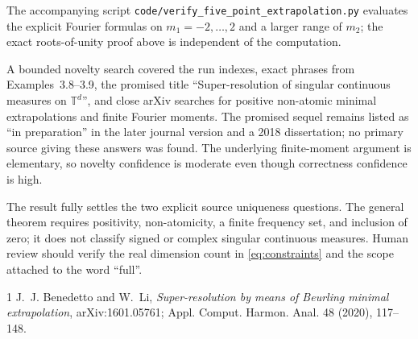 \documentclass[11pt,a4paper]{article}
\newcommand{\T}{\mathbb{T}}
\begin{document}
The accompanying script
\texttt{code/verify\_five\_point\_extrapolation.py} evaluates the explicit
Fourier formulas on $m_1=-2,\ldots,2$ and a larger range of $m_2$; the exact
roots-of-unity proof above is independent of the computation.

A bounded novelty search covered the run indexes, exact phrases from
Examples~3.8--3.9, the promised title ``Super-resolution of singular continuous
measures on $\T^d$'', and close arXiv searches for positive non-atomic minimal
extrapolations and finite Fourier moments.  The promised sequel remains listed
as ``in preparation'' in the later journal version and a 2018 dissertation;
no primary source giving these answers was found.  The underlying
finite-moment argument is elementary, so novelty confidence is moderate even
though correctness confidence is high.

The result fully settles the two explicit source uniqueness questions.  The
general theorem requires positivity, non-atomicity, a finite frequency set,
and inclusion of zero; it does not classify signed or complex singular
continuous measures.  Human review should verify the real dimension count in
\eqref{eq:constraints} and the scope attached to the word ``full''.

\begin{thebibliography}{1}
J.~J. Benedetto and W.~Li,
\emph{Super-resolution by means of Beurling minimal extrapolation},
arXiv:1601.05761; Appl. Comput. Harmon. Anal. 48 (2020), 117--148.
\end{thebibliography}
\end{document}
